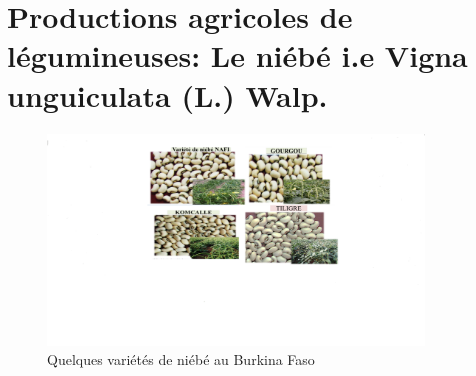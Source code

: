 \documentclass[a4paper,11pt]{article}
\begin{document}

\section{Productions agricoles de légumineuses: Le niébé i.e Vigna unguiculata (L.) Walp.}
\begin{figure}%
  \begin{center}
   \includegraphics[width=10cm]{images/VariétésdeNiébéauBF}
  \end{center}
\caption{Quelques variétés de niébé au Burkina Faso}
\end{figure}

\end{document}
